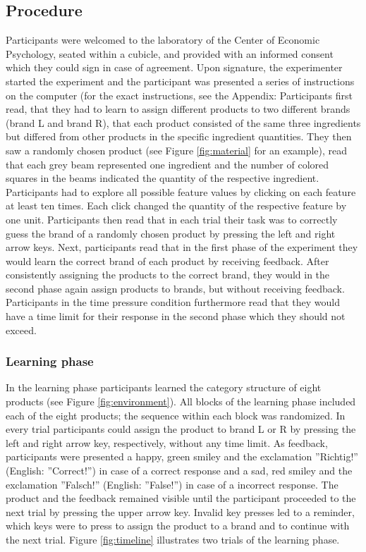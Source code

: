 \documentclass[a4paper,man,natbib]{apa6}
\begin{document}
\subsection{Procedure}
Participants were welcomed to the laboratory of the Center of Economic Psychology, seated within a cubicle, and provided with an informed consent which they could sign in case of agreement. Upon signature, the experimenter started the experiment and the participant was presented a series of instructions on the computer (for the exact instructions, see the Appendix: Participants first read, that they had to learn to assign different products to two different brands (brand L and brand R), that each product consisted of the same three ingredients but differed from other products in the specific ingredient quantities. They then saw a randomly chosen product (see Figure \ref{fig:material} for an example), read that each grey beam represented one ingredient and the number of colored squares in the beams indicated the quantity of the respective ingredient. Participants had to explore all possible feature values by clicking on each feature at least ten times. Each click changed the quantity of the respective feature by one unit. Participants then read that in each trial their task was to correctly guess the brand of a randomly chosen product by pressing the left and right arrow keys. Next, participants read that in the first phase of the experiment they would learn the correct brand of each product by receiving feedback. After consistently assigning the products to the correct brand, they would in the second phase again assign products to brands, but without receiving feedback. Participants in the time pressure condition furthermore read that they would have a time limit for their response in the second phase which they should not exceed.

\subsubsection{Learning phase}
In the learning phase participants learned the category structure of eight products (see Figure \ref{fig:environment}). All blocks of the learning phase included each of the eight products; the sequence within each block was randomized. In every trial participants could assign the product to brand L or R by pressing the left and right arrow key, respectively, without any time limit. As feedback, participants were presented a happy, green smiley and the exclamation ''Richtig!'' (English: ''Correct!'') in case of a correct response and a sad, red smiley and the exclamation ''Falsch!'' (English: ''False!'') in case of a incorrect response. The product and the feedback remained visible until the participant proceeded to the next trial by pressing the upper arrow key. 
Invalid key presses led to a reminder, which keys were to press to assign the product to a brand and to continue with the next trial. 
Figure \ref{fig:timeline} illustrates two trials of the learning phase.
\end{document}
